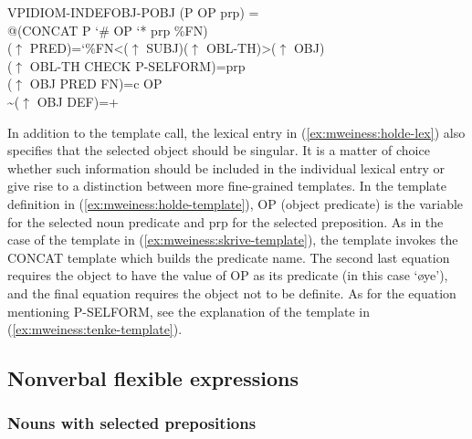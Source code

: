 \documentclass[output=paper]{langsci/langscibook}
\begin{document}

\ea\label{ex:mweiness:holde-template}
{\small 
 VPIDIOM-INDEFOBJ-POBJ (P OP prp) =\\
\hspace{1.5em} @(CONCAT P `\# OP `* prp \%FN)\\
\hspace{1.5em}  ($\uparrow$  PRED)=`\%FN<($\uparrow$ SUBJ)($\uparrow$ OBL-TH)>($\uparrow$ OBJ)\\
\hspace{1.5em} ($\uparrow$ OBL-TH CHECK P-SELFORM)=prp\\
\hspace{1.5em} ($\uparrow$ OBJ PRED FN)=c OP\\
\hspace{1.5em} {\textasciitilde}($\uparrow$ OBJ DEF)=+
}
\z

In addition to the template call, the lexical entry in   (\ref{ex:mweiness:holde-lex}) also specifies that the selected object should be singular.
It is a matter of choice whether such information should be included in the individual lexical entry or give rise to a distinction between more fine-grained templates.
In the template definition in (\ref{ex:mweiness:holde-template}), OP (object predicate) is the variable for the selected noun predicate and prp for the selected preposition.
As in the case of the template in (\ref{ex:mweiness:skrive-template}), the template invokes the CONCAT template which builds the predicate name.
The second last equation requires the object to have the value of OP as its predicate (in this case `øye'), and the final equation requires the object not to be definite.
As for the equation mentioning P-SELFORM, see the explanation of the template in (\ref{ex:mweiness:tenke-template}).

\subsection{Nonverbal flexible expressions}\label{sec:mweiness:nonverbal}

\subsubsection{Nouns with selected prepositions}\label{sec:mweiness:prepnoun}
\end{document}
